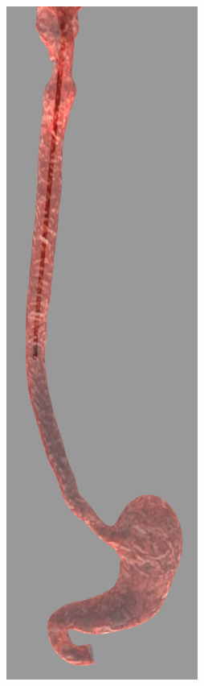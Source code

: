\documentclass[12pt,a4]{article}
\begin{document}
\begin{figure}[ht!]
\begin{subfigure}{0.15\textwidth}
    \end{subfigure}%
    ~
        \begin{subfigure}{0.15\textwidth}
        \centering
        \includegraphics[width=0.6\linewidth]{figures/GIsnaps/2.png}
       

\end{subfigure}
\end{figure}
\end{document}
